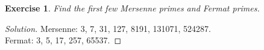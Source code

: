 \documentclass[12pt,leqno]{article}
\numberwithin{equation}{section}
\newtheorem{exer}[thm]{Exercise}
\theoremstyle{definition}
\begin{document}

\begin{exer}
Find the first few Mersenne primes and Fermat primes.
\end{exer}

\begin{proof}[Solution]
Mersenne: 3, 7, 31, 127, 8191, 131071, 524287.\\
Fermat: 3, 5, 17, 257, 65537.
\end{proof}
\end{document}
